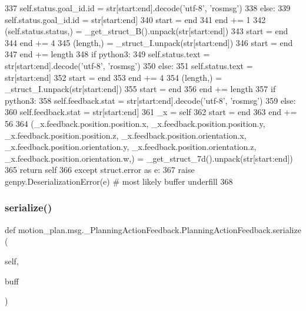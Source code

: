 \begin{DoxyCode}
337         self.status.goal\_id.id = str[start:end].decode(\textcolor{stringliteral}{'utf-8'}, \textcolor{stringliteral}{'rosmsg'})
338       \textcolor{keywordflow}{else}:
339         self.status.goal\_id.id = str[start:end]
340       start = end
341       end += 1
342       (self.status.status,) = \_get\_struct\_B().unpack(str[start:end])
343       start = end
344       end += 4
345       (length,) = \_struct\_I.unpack(str[start:end])
346       start = end
347       end += length
348       \textcolor{keywordflow}{if} python3:
349         self.status.text = str[start:end].decode(\textcolor{stringliteral}{'utf-8'}, \textcolor{stringliteral}{'rosmsg'})
350       \textcolor{keywordflow}{else}:
351         self.status.text = str[start:end]
352       start = end
353       end += 4
354       (length,) = \_struct\_I.unpack(str[start:end])
355       start = end
356       end += length
357       \textcolor{keywordflow}{if} python3:
358         self.feedback.stat = str[start:end].decode(\textcolor{stringliteral}{'utf-8'}, \textcolor{stringliteral}{'rosmsg'})
359       \textcolor{keywordflow}{else}:
360         self.feedback.stat = str[start:end]
361       \_x = self
362       start = end
363       end += 56
364       (\_x.feedback.position.position.x, \_x.feedback.position.position.y, \_x.feedback.position.position.z, 
      \_x.feedback.position.orientation.x, \_x.feedback.position.orientation.y, \_x.feedback.position.orientation.z, 
      \_x.feedback.position.orientation.w,) = \_get\_struct\_7d().unpack(str[start:end])
365       \textcolor{keywordflow}{return} self
366     \textcolor{keywordflow}{except} struct.error \textcolor{keyword}{as} e:
367       \textcolor{keywordflow}{raise} genpy.DeserializationError(e)  \textcolor{comment}{# most likely buffer underfill}
368 
\end{DoxyCode}
\mbox{\label{classmotion__plan_1_1msg_1_1__PlanningActionFeedback_1_1PlanningActionFeedback_a9ecf6164955fa3379baebaee5c59357b}} 
\subsubsection{\texorpdfstring{serialize()}{serialize()}}
{\footnotesize\ttfamily def motion\+\_\+plan.\+msg.\+\_\+\+Planning\+Action\+Feedback.\+Planning\+Action\+Feedback.\+serialize (\begin{DoxyParamCaption}\item[{}]{self,  }\item[{}]{buff }\end{DoxyParamCaption})}

